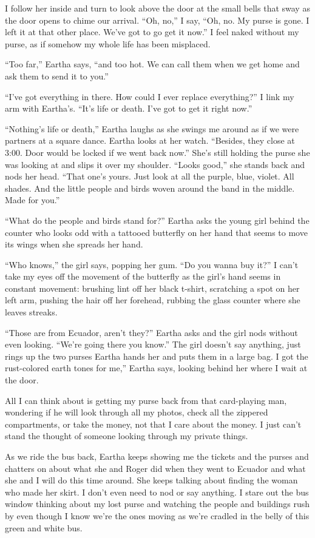\documentclass[twoside,10pt]{book}
\begin{document}
I follow her inside and turn to look above the door at the small bells
that sway as the door opens to chime our arrival. ``Oh, no,'' I say,
``Oh, no. My purse is gone. I left it at that other place. We've got to
go get it now.'' I feel naked without my purse, as if somehow my whole
life has been misplaced.

``Too far,'' Eartha says, ``and too hot. We can call them when we get
home and ask them to send it to you.''

``I've got everything in there. How could I ever replace everything?'' I
link my arm with Eartha's. ``It's life or death. I've got to get it
right now.''

``Nothing's life or death,'' Eartha laughs as she swings me around as if
we were partners at a square dance. Eartha looks at her watch.
``Besides, they close at 3:00. Door would be locked if we went back
now.'' She's still holding the purse she was looking at and slips it
over my shoulder. ``Looks good,'' she stands back and nods her head.
``That one's yours. Just look at all the purple, blue, violet. All
shades. And the little people and birds woven around the band in the
middle. Made for you.''

``What do the people and birds stand for?'' Eartha asks the young girl
behind the counter who looks odd with a tattooed butterfly on her hand
that seems to move its wings when she spreads her hand.

``Who knows,'' the girl says, popping her gum. ``Do you wanna buy it?''
I can't take my eyes off the movement of the butterfly as the girl's
hand seems in constant movement: brushing lint off her black t-shirt,
scratching a spot on her left arm, pushing the hair off her forehead,
rubbing the glass counter where she leaves streaks.

``Those are from Ecuador, aren't they?'' Eartha asks and the girl nods
without even looking. ``We're going there you know.'' The girl doesn't
say anything, just rings up the two purses Eartha hands her and puts
them in a large bag. I got the rust-colored earth tones for me,'' Eartha
says, looking behind her where I wait at the door.

All I can think about is getting my purse back from that card-playing
man, wondering if he will look through all my photos, check all the
zippered compartments, or take the money, not that I care about the
money. I just can't stand the thought of someone looking through my
private things.

As we ride the bus back, Eartha keeps showing me the tickets and the
purses and chatters on about what she and Roger did when they went to
Ecuador and what she and I will do this time around. She keeps talking
about finding the woman who made her skirt. I don't even need to nod or
say anything. I stare out the bus window thinking about my lost purse
and watching the people and build­ings rush by even though I know we're
the ones moving as we're cradled in the belly of this green and white
bus.
\end{document}
